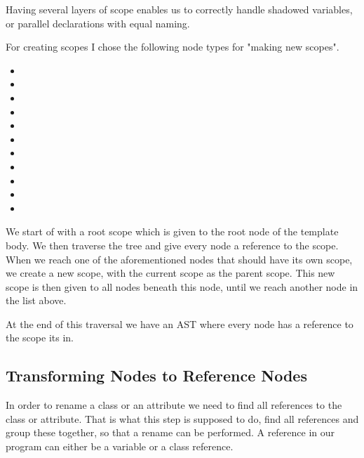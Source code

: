 Having several layers of scope enables us to correctly handle shadowed variables, or parallel declarations with equal naming.

For creating scopes I chose the following node types for "making new scopes".

\begin{multicols}{2}
\begin{itemize}
    \item {}
    \item {}
    \item {}
    \item {}
    \item {}
    \item {}
    \item {}
    \item {}
    \item {}
    \item {}
    \item {}
\end{itemize}
\end{multicols}

We start of with a root scope which is given to the root node of the template body.
We then traverse the tree and give every node a reference to the scope.
When we reach one of the aforementioned nodes that should have its own scope, we create a new scope, with the current scope as the parent scope.
This new scope is then given to all nodes beneath this node, until we reach another node in the list above.

At the end of this traversal we have an AST where every node has a reference to the scope its in.

\subsection{Transforming Nodes to Reference Nodes}\label{subsec:transforming-nodes-to-references}

In order to rename a class or an attribute we need to find all references to the class or attribute.
That is what this step is supposed to do, find all references and group these together, so that a rename can be performed.
A reference in our program can either be a variable or a class reference.

